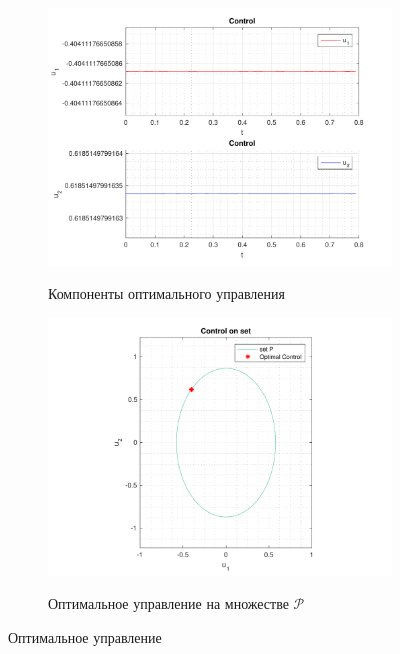 \documentclass[11pt, oneside, final]{article}
\theoremstyle{break}
\numberwithin{equation}{section}
\theoremstyle{plain}
\theoremstyle{definition}
\begin{document}
    \begin{figure}[H]
        \begin{subfigure}{0.5\linewidth}
            \centering
            \includegraphics[width=\linewidth]{s2fig3}
            \label{pic:s2:3}
            \caption{Компоненты оптимального управления}
        \end{subfigure}
        \begin{subfigure}{0.5\linewidth}
            \centering
            \includegraphics[width=\linewidth]{s2fig4}
            \label{pic:s2:4}
            \caption{Оптимальное управление на множестве \(\mathcal{P}\)}
        \end{subfigure}
        \caption{Оптимальное управление}
    \end{figure}
\end{document}
